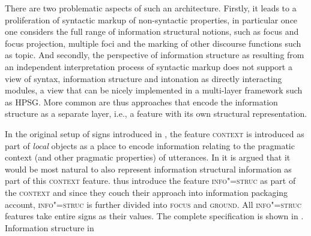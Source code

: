 \documentclass[output=paper
 	        ,biblatex
                ,babelshorthands
                ,newtxmath
                ,draftmode
                ,colorlinks, citecolor=brown
]{langscibook}
\begin{document}
There are two problematic aspects of such an architecture. Firstly, it
leads to a proliferation of syntactic markup of non-syntactic
properties, in particular once one considers the full range of
information structural notions, such as focus and focus projection,
multiple foci and the marking of other discourse functions such as
topic. And secondly, the perspective of information structure as
resulting from an independent interpretation process of syntactic
markup does not support a view of syntax, information structure and
intonation as directly interacting modules, a view that can be nicely
implemented in a multi-layer framework such as HPSG.
More common are thus approaches that encode the information structure
as a separate layer, i.e., a feature with its own structural
representation.

In the original setup of signs introduced in \cite{ps2}, the feature
\textsc{context} is introduced as part of \textit{local} objects as a
place to encode information relating to the pragmatic context (and
other pragmatic properties) of utterances. In \cite{EV96a} it is
argued that it would be most natural to also represent information
structural information as part of this \textsc{context}
feature. \cite{EV96a} thus introduce the feature \textsc{info"=struc}
as part of the \textsc{context} and since they couch their
approach into  information packaging account,
\textsc{info"=struc} is further divided into \textsc{focus} and
\textsc{ground}. All \textsc{info"=struc} features take entire signs as
their values. The complete specification is shown in
.
\ea \label{fig:e-v-info-struc}
Information structure in \cite[56]{EV96a}
        \leavevmode
{}
\z
\end{document}
